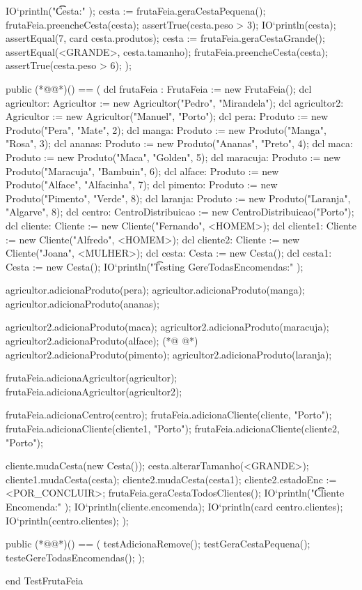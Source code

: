 \begin{vdmpp}[breaklines=true]
 IO`println("\t\t Cesta:" );
 cesta := frutaFeia.geraCestaPequena();
 frutaFeia.preencheCesta(cesta);
 assertTrue(cesta.peso > 3);
 IO`println(cesta); 
 assertEqual(7, card cesta.produtos);
 cesta := frutaFeia.geraCestaGrande();
 assertEqual(<GRANDE>, cesta.tamanho);
 frutaFeia.preencheCesta(cesta);
 assertTrue(cesta.peso > 6);
);

public (*@@*)() == (
 dcl frutaFeia : FrutaFeia := new FrutaFeia(); 
 dcl agricultor: Agricultor := new Agricultor("Pedro", "Mirandela"); 
 dcl agricultor2: Agricultor := new Agricultor("Manuel", "Porto");
 dcl pera: Produto := new Produto("Pera", "Mate", 2);
 dcl manga: Produto := new Produto("Manga", "Rosa", 3);
 dcl ananas: Produto := new Produto("Ananas", "Preto", 4);
 dcl maca: Produto := new Produto("Maca", "Golden", 5);
 dcl maracuja: Produto := new Produto("Maracuja", "Bambuin", 6);
  dcl alface: Produto := new Produto("Alface", "Alfacinha", 7);
  dcl pimento: Produto := new Produto("Pimento", "Verde", 8);
  dcl laranja: Produto := new Produto("Laranja", "Algarve", 8);  
  dcl centro: CentroDistribuicao := new CentroDistribuicao("Porto");
  dcl cliente: Cliente := new Cliente("Fernando", <HOMEM>);
  dcl cliente1: Cliente := new Cliente("Alfredo", <HOMEM>);
  dcl cliente2: Cliente := new Cliente("Joana", <MULHER>);
  dcl cesta: Cesta := new Cesta(); 
  dcl cesta1: Cesta := new Cesta(); 
 IO`println("\t Testing GereTodasEncomendas:" );  
  
 agricultor.adicionaProduto(pera);
 agricultor.adicionaProduto(manga);
 agricultor.adicionaProduto(ananas);
 
 agricultor2.adicionaProduto(maca);
 agricultor2.adicionaProduto(maracuja);
 agricultor2.adicionaProduto(alface);
(*@
\label{testAll:95}
@*)
 agricultor2.adicionaProduto(pimento);
 agricultor2.adicionaProduto(laranja);
  
 frutaFeia.adicionaAgricultor(agricultor);
 frutaFeia.adicionaAgricultor(agricultor2);
 
 frutaFeia.adicionaCentro(centro);
 frutaFeia.adicionaCliente(cliente, "Porto");
 frutaFeia.adicionaCliente(cliente1, "Porto");
 frutaFeia.adicionaCliente(cliente2, "Porto");
 
 cliente.mudaCesta(new Cesta());
 cesta.alterarTamanho(<GRANDE>);
 cliente1.mudaCesta(cesta);
 cliente2.mudaCesta(cesta1);
 cliente2.estadoEnc := <POR_CONCLUIR>;
 frutaFeia.geraCestaTodosClientes(); 
 IO`println("\t\t Cliente Encomenda:" );
 IO`println(cliente.encomenda);
 IO`println(card centro.clientes);
 IO`println(centro.clientes); 
);

public (*@@*)() == (
 testAdicionaRemove();
 testGeraCestaPequena();
 testeGereTodasEncomendas();
);

end TestFrutaFeia
\end{vdmpp}
